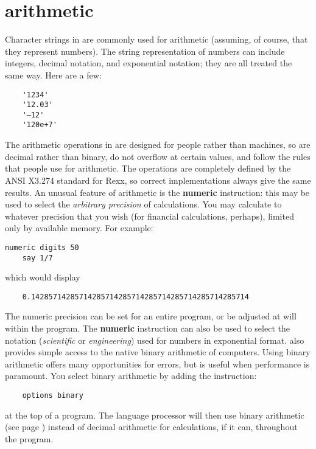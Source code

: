 \section{\nr{} arithmetic}
Character strings in \nr{} are commonly used for arithmetic
(assuming, of course, that they represent numbers). The string
representation of numbers can include integers, decimal notation,
and exponential notation; they are all treated the same way. Here are
a few:
\begin{verbatim}
    '1234'
    '12.03'
    '–12'
    '120e+7'
\end{verbatim}
The arithmetic operations in \nr{} are designed for people rather than machines, so are decimal rather than binary, do not overflow at certain values, and follow the rules that people use for arithmetic. The operations are completely defined by the ANSI X3.274 standard for Rexx, so correct implementations always give the same results.
An unusual feature of \nr{} arithmetic is the \textbf{numeric} instruction:
this may be used to select the \emph{arbitrary precision} of
calculations. You may calculate to whatever precision that you wish
(for financial calculations, perhaps), limited only by available
memory. For example:
\begin{lstlisting}[label=Digits,caption=Digits]
    numeric digits 50
    say 1/7
\end{lstlisting}
which would display
\begin{verbatim}
    0.14285714285714285714285714285714285714285714285714
\end{verbatim}
The numeric precision can be set for an entire program, or be adjusted at will within the program. The \textbf{numeric} instruction can also be used to select the notation (\emph{scientific} or \emph{engineering}) used for numbers in exponential format.
\nr{} also provides simple access to the native binary arithmetic of
computers. Using binary arithmetic offers many opportunities for
errors, but is useful when performance is paramount. You select binary
arithmetic by adding the instruction:
\begin{verbatim}
    options binary
\end{verbatim}
at the top of a \nr{} program. The language processor will then use
binary arithmetic (see page \pageref{binarith}) instead of \nr{} decimal arithmetic for calculations, if it can, throughout the program.
